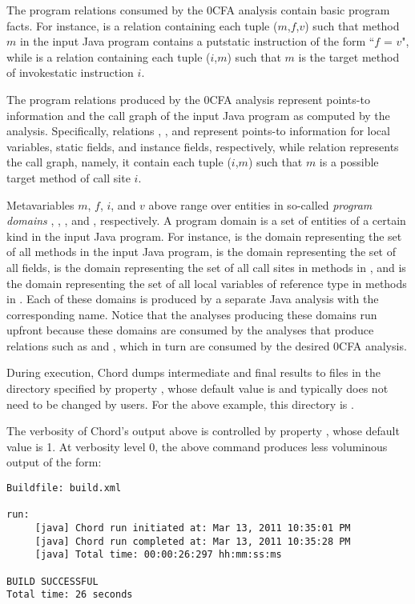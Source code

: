 The program relations consumed by the 0CFA analysis contain basic program facts.
For instance,  is a relation containing each tuple
($m$,$f$,$v$) such that method $m$ in the input Java program contains a
putstatic instruction of the form ``$f$ = $v$", while  is a
relation containing each tuple ($i$,$m$) such that $m$ is the target method of
invokestatic instruction $i$.

The program relations produced by the 0CFA analysis represent points-to
information and the call graph of the input Java program as computed by the
analysis.  Specifically, relations , , and 
represent points-to information for local variables, static fields, and instance
fields, respectively, while relation  represents the call graph,
namely, it contain each tuple ($i$,$m$) such that $m$ is a possible target
method of call site $i$.

Metavariables $m$, $f$, $i$, and $v$ above range over entities in so-called
{\it program domains} , , , and , respectively.
A program domain is a set of entities of a certain kind in the input Java
program.  For instance,  is the domain representing the set of all
methods in the input Java program,  is the domain representing the set
of all fields,  is the domain representing the set of all call sites in
methods in , and  is the domain representing the set of all
local variables of reference type in methods in .  Each of these domains
is produced by a separate Java analysis with the corresponding name.  Notice
that the analyses producing these domains run upfront because these domains are
consumed by the analyses that produce relations such as 
and , which in turn are consumed by the desired 0CFA analysis.

During execution, Chord dumps intermediate and final results to files in the
directory specified by property , whose default value is
 and typically does not need to be changed
by users.  For the above example, this directory is
.

The verbosity of Chord's output above is controlled by property
, whose default value is 1.  At verbosity level 0, the above
command produces less voluminous output of the form:

\begin{framed}
{\small
\begin{verbatim}
Buildfile: build.xml

run:
     [java] Chord run initiated at: Mar 13, 2011 10:35:01 PM
     [java] Chord run completed at: Mar 13, 2011 10:35:28 PM
     [java] Total time: 00:00:26:297 hh:mm:ss:ms

BUILD SUCCESSFUL
Total time: 26 seconds
\end{verbatim}
}
\end{framed}

